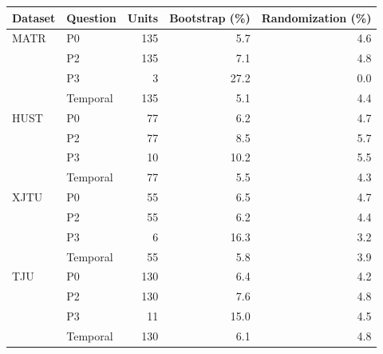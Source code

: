 \begin{tabular}{llrrr}
\toprule
Dataset & Question & Units & Bootstrap (\%) & Randomization (\%) \\
\midrule
MATR & P0 & 135 & 5.7 & 4.6 \\
 & P2 & 135 & 7.1 & 4.8 \\
 & P3 & 3 & 27.2 & 0.0 \\
 & Temporal & 135 & 5.1 & 4.4 \\
HUST & P0 & 77 & 6.2 & 4.7 \\
 & P2 & 77 & 8.5 & 5.7 \\
 & P3 & 10 & 10.2 & 5.5 \\
 & Temporal & 77 & 5.5 & 4.3 \\
XJTU & P0 & 55 & 6.5 & 4.7 \\
 & P2 & 55 & 6.2 & 4.4 \\
 & P3 & 6 & 16.3 & 3.2 \\
 & Temporal & 55 & 5.8 & 3.9 \\
TJU & P0 & 130 & 6.4 & 4.2 \\
 & P2 & 130 & 7.6 & 4.8 \\
 & P3 & 11 & 15.0 & 4.5 \\
 & Temporal & 130 & 6.1 & 4.8 \\
\bottomrule
\end{tabular}

